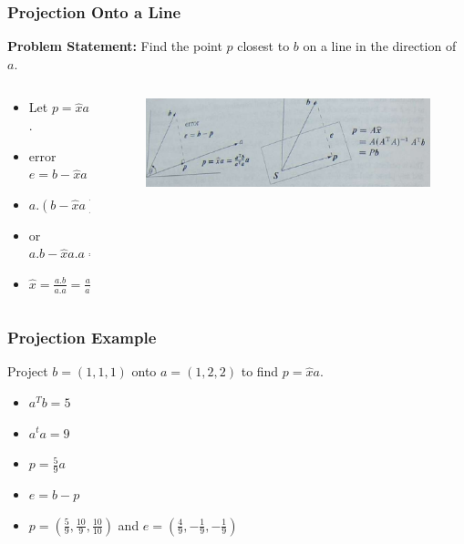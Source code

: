 \documentclass{beamer}
\newtheorem{Key points}{Key points}
\begin{document}
 \begin{frame}
   \frametitle{Projection Onto a Line}
   \textbf{{\color{red}Problem Statement:}} Find the point $p$  closest to $b$ on a line in the direction of $a$.
\begin{columns}[onlytextwidth]
    \begin{column}{0.4\textwidth}
      \centering
   \begin{itemize}
   \item Let $p=\hat{x}a$.
   \item<2-> error $e=b-\hat{x}a$
   \item<3-> $a.(b-\hat{x}a)=0$
   \item<4-> or $a.b - \hat{x}a.a=0$
   \item<5-> $\hat{x}=\frac{a.b}{a.a}=\frac{a^Tb}{a^Ta}$
   \end{itemize}
\end{column}
    \begin{column}{0.6\textwidth}
      \centering
\begin{figure}
\includegraphics[width=1\columnwidth]{projline}\\
\end{figure}
    \end{column}
\end{columns}
 \end{frame}
 \begin{frame}
   \frametitle{Projection Example}
   Project $b=(1,1,1)$ onto $a=(1,2,2)$ to find $p=\hat{x}a$.
   \begin{itemize}
   \item<2-> $a^Tb=5$
   \item<3-> $a^ta=9$
   \item<4-> $p=\frac{5}{9}a$
   \item<5-> $e=b-p$
   \item<6-> $p=(\frac{5}{9},\frac{10}{9},\frac{10}{10})$ and $e=(\frac{4}{9},-\frac{1}{9},-\frac{1}{9})$
   \end{itemize}
 \end{frame}
\end{document}
